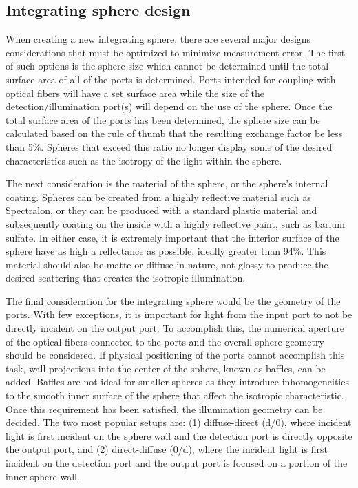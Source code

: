\subsection{Integrating sphere design}
When creating a new integrating sphere, there are several major designs considerations that must be optimized to minimize measurement error. The first of such options is the sphere size which cannot be determined until the total surface area of all of the ports is determined. Ports intended for coupling with optical fibers will have a set surface area while the size of the detection/illumination port(s) will depend on the use of the sphere. Once the total surface area of the ports has been determined, the sphere size can be calculated based on the rule of thumb that the resulting exchange factor be less than 5\%.\cite{Labsphereb} Spheres that exceed this ratio no longer display some of the desired characteristics such as the isotropy of the light within the sphere.

The next consideration is the material of the sphere, or the sphere's internal coating. Spheres can be created from a highly reflective material such as Spectralon, or they can be produced with a standard plastic material and subsequently coating on the inside with a highly reflective paint, such as barium sulfate. In either case, it is extremely important that the interior surface of the sphere have as high a reflectance as possible, ideally greater than 94\%. This material should also be matte or diffuse in nature, not glossy to produce the desired scattering that creates the isotropic illumination.

The final consideration for the integrating sphere would be the geometry of the ports. With few exceptions, it is important for light from the input port to not be directly incident on the output port. To accomplish this, the numerical aperture of the optical fibers connected to the ports and the overall sphere geometry should be considered. If physical positioning of the ports cannot accomplish this task,  wall projections into the center of the sphere, known as baffles, can be added. Baffles are not ideal for smaller spheres as they introduce inhomogeneities to the smooth inner surface of the sphere that affect the isotropic characteristic. Once this requirement has been satisfied, the illumination geometry can be decided. The two most popular setups are: (1) diffuse-direct (d/0\degree), where incident light is first incident on the sphere wall and the detection port is directly opposite the output port, and (2) direct-diffuse (0\degree/d), where the incident light is first incident on the detection port and the output port is focused on a portion of the inner sphere wall.\cite{Springsteen1998}


